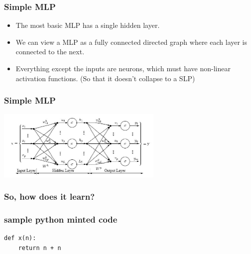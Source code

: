 \documentclass{beamer}
\begin{document}
\begin{frame}
\frametitle{Simple MLP}
\begin{itemize}
\item The most basic MLP has a single hidden layer.
\item We can view a MLP as a fully connected directed graph where each layer is connected to the next.
\item Everything except the inputs are neurons, which must have non-linear activation functions. (So that it doesn't collapse to a SLP)
\end{itemize}
\end{frame}
\begin{frame}
\frametitle{Simple MLP}

\includegraphics[width=300px]{mls.jpg}

\end{frame}

\begin{frame}	
\frametitle{So, how does it learn?}
\end{frame}

\begin{frame}
\frametitle{sample python minted code}
\begin{verbatim}
def x(n):
    return n + n
\end{verbatim}

\end{frame}
\end{document}
